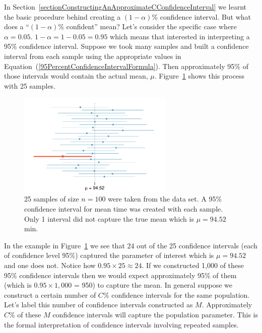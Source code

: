 In Section~\ref{sectionConstructingAnApproximateCConfidenceInterval} we learnt the basic procedure
behind creating a $(1-\alpha)$\% confidence interval.
But what does a ``$(1-\alpha)$\% confident'' mean? 
Let's consider the specific case where $\alpha = 0.05$.
$1 - \alpha = 1 - 0.05 = 0.95$ which means that interested in interpreting a 
95\% confidence interval.
Suppose we took many samples and built a confidence interval from each sample using the appropriate values in Equation~(\ref{95PercentConfidenceIntervalFormula}). Then approximately 95\% of those intervals would contain the actual mean, $\mu$. 
Figure~\ref{95PercentConfidenceInterval} shows this process with 25 samples.
\vspace{-7mm}
\begin{figure}[H]
   \centering
   \includegraphics[width=0.66\textwidth]{04-5/figures/95PercentConfidenceInterval/95PercentConfidenceInterval}
   \caption{25 samples of size $n=100$ were taken from the  data set. A 95\% confidence interval for mean time was created with each sample. Only 1 interval did not capture the true mean which is $\mu = 94.52$ min.}

   \label{95PercentConfidenceInterval}
\end{figure}

In the example in Figure~\ref{95PercentConfidenceInterval} 
we see that 24 out of the 25 confidence intervals (each of confidence level 95\%) captured the parameter of interest which is $\mu=94.52$ and one does not.
Notice how $0.95 \times 25 \approx 24$.
If we constructed 1,000 of these 95\% confidence intervals then we would expect approximately 95\% of them
(which is $0.95 \times 1,000$ = 950) to capture the mean.
In general suppose we construct a certain number of $C\%$ confidence intervals for the same population.
Let's label this number of confidence intervals constructed as $M$.
Approximately $C\%$ of these $M$ confidence intervals will capture the population parameter.
This is the formal interpretation of confidence intervals involving repeated samples.


